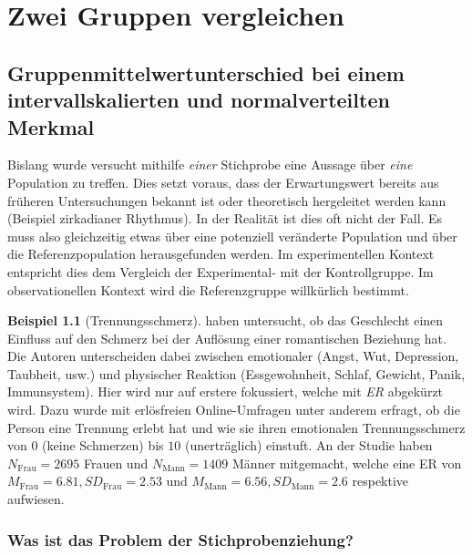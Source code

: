 \documentclass[
]{book}
\theoremstyle{definition}
\theoremstyle{definition}
\newtheorem{example}{Beispiel}[chapter]
\theoremstyle{definition}
\theoremstyle{definition}
\theoremstyle{remark}
\begin{document}
\part{Zwei Gruppen vergleichen}\label{part-zwei-gruppen-vergleichen}

\chapter{Gruppenmittelwertunterschied bei einem intervallskalierten und normalverteilten Merkmal}\label{gruppenmittelwertunterschied-bei-einem-intervallskalierten-und-normalverteilten-merkmal}

Bislang wurde versucht mithilfe \emph{einer} Stichprobe eine Aussage über \emph{eine} Population zu treffen. Dies setzt voraus, dass der Erwartungswert bereits aus früheren Untersuchungen bekannt ist oder theoretisch hergeleitet werden kann (Beispiel zirkadianer Rhythmus). In der Realität ist dies oft nicht der Fall. Es muss also gleichzeitig etwas über eine potenziell veränderte Population und über die Referenzpopulation herausgefunden werden. Im experimentellen Kontext entspricht dies dem Vergleich der Experimental- mit der Kontrollgruppe. Im observationellen Kontext wird die Referenzgruppe willkürlich bestimmt.

\begin{example}[Trennungsschmerz]
\protect\hypertarget{exm:breakup}{}\label{exm:breakup}\citet{morris2015} haben untersucht, ob das Geschlecht einen Einfluss auf den Schmerz bei der Auflösung einer romantischen Beziehung hat. Die Autoren unterscheiden dabei zwischen emotionaler (Angst, Wut, Depression, Taubheit, usw.) und physischer Reaktion (Essgewohnheit, Schlaf, Gewicht, Panik, Immunsystem). Hier wird nur auf erstere fokussiert, welche mit \emph{ER} abgekürzt wird. Dazu wurde mit erlösfreien Online-Umfragen unter anderem erfragt, ob die Person eine Trennung erlebt hat und wie sie ihren emotionalen Trennungsschmerz von \(0\) (keine Schmerzen) bis \(10\) (unerträglich) einstuft. An der Studie haben \(N_\text{Frau} = 2695\) Frauen und \(N_\text{Mann} = 1409\) Männer mitgemacht, welche eine ER von \(M_\text{Frau} = 6.81, SD_\text{Frau} = 2.53\) und \(M_\text{Mann} = 6.56, SD_\text{Mann} = 2.6\) respektive aufwiesen.
\end{example}

\section{Was ist das Problem der Stichprobenziehung?}\label{was-ist-das-problem-der-stichprobenziehung}
\end{document}
